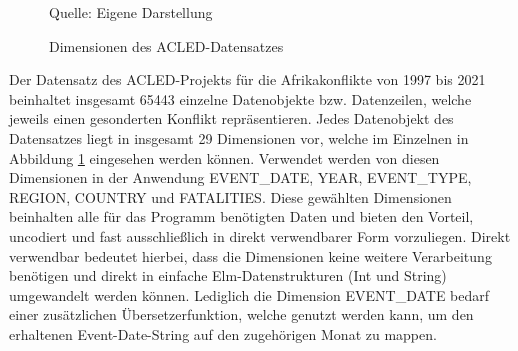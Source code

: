\documentclass[usegeometry=true]{scrartcl}
\begin{document}
\begin{figure}[]
\begin{center}
\begin{tabular}{lllll}
\end{tabular}

\caption{Dimensionen des ACLED-Datensatzes}
Quelle: Eigene Darstellung
\label{dimensions}
\end{center}
\end{figure}

Der Datensatz des ACLED-Projekts für die Afrikakonflikte von 1997 bis 2021 beinhaltet insgesamt 65443 einzelne Datenobjekte bzw. Datenzeilen, welche jeweils einen gesonderten Konflikt repräsentieren. Jedes Datenobjekt des Datensatzes liegt in insgesamt 29 Dimensionen vor, welche im Einzelnen in Abbildung \ref{dimensions} eingesehen werden können. Verwendet werden von diesen Dimensionen in der Anwendung EVENT\_DATE, YEAR, EVENT\_TYPE, REGION, COUNTRY und FATALITIES. Diese gewählten Dimensionen beinhalten alle für das Programm benötigten Daten und bieten den Vorteil, uncodiert und fast ausschließlich in direkt verwendbarer Form vorzuliegen. Direkt verwendbar bedeutet hierbei, dass die Dimensionen keine weitere Verarbeitung benötigen und direkt in einfache Elm-Datenstrukturen (Int und String) umgewandelt werden können. Lediglich die Dimension EVENT\_DATE bedarf einer zusätzlichen Übersetzerfunktion, welche genutzt werden kann, um den erhaltenen Event-Date-String auf den zugehörigen Monat zu mappen.\\
\end{document}

